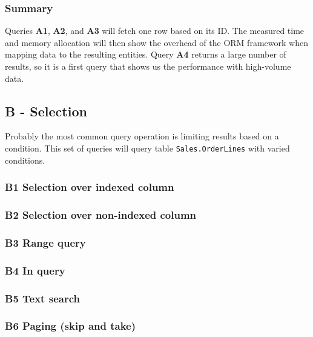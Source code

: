 \subsubsection*{Summary}
Queries \textbf{A1}, \textbf{A2}, and \textbf{A3} will fetch one row based on its ID. The measured time and memory allocation will then show the overhead of the ORM framework when mapping data to the resulting entities. Query \textbf{A4} returns a large number of results, so it is a first query that shows us the performance with high-volume data.

\subsection{B - Selection}
Probably the most common query operation is limiting results based on a condition. This set of queries will query table \texttt{Sales.OrderLines} with varied conditions.

\subsubsection*{B1 Selection over indexed column}

\subsubsection*{B2 Selection over non-indexed column}

\subsubsection*{B3 Range query}

\subsubsection*{B4 In query}

\subsubsection*{B5 Text search}

\subsubsection*{B6 Paging (skip and take)}